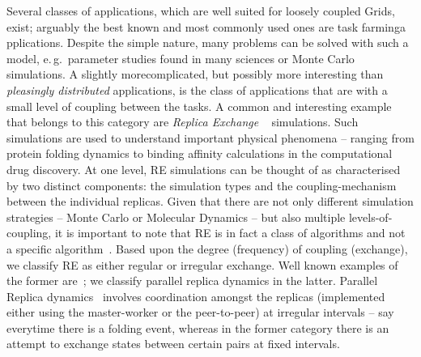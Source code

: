 \documentclass[times, 10pt,twocolumn]{article}
\begin{document}
\begin{abstract}
\end{abstract}

                           
Several classes of applications, which are well suited for loosely
coupled Grids, exist; arguably the best known and most commonly used
ones are task farminga pplications. Despite the simple nature, many
problems can be solved with such a model, e.\,g.\ parameter studies
found in many sciences or Monte Carlo simulations. A slightly
morecomplicated, but possibly more interesting than {\it pleasingly
  distributed} applications, is the class of applications that are
with a small level of coupling between the tasks.  
A common and interesting example that belongs to this category are
\emph{Replica Exchange }~\cite{hansmann,Sugita:1999rm} simulations.
Such simulations are used to understand important physical phenomena
-- ranging from protein folding dynamics to binding affinity
calculations in the computational drug discovery.  At one level, RE
simulations can be thought of as characterised by two distinct
components: the simulation types and the coupling-mechanism between
the individual replicas. Given that there are not only different
simulation strategies -- Monte Carlo or Molecular Dynamics -- but also
multiple levels-of-coupling, it is important to note that RE is in
fact a class of algorithms and not a specific
algorithm~\cite{dpa_surveypaper}.  Based upon the degree (frequency)
of coupling (exchange), we classify RE as either regular or irregular
exchange. Well known examples of the former
are~\cite{hansmann,Sugita:1999rm}; we classify parallel replica
dynamics in the latter. Parallel Replica dynamics~\cite{SPdynamics,
  pande_bj03} involves coordination amongst the replicas (implemented
either using the master-worker or the peer-to-peer) at irregular
intervals -- say everytime there is a folding event, whereas in the
former category there is an attempt to exchange states between certain
pairs at fixed intervals.

\end{document}
